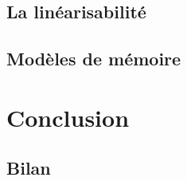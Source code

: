 \subsection{La linéarisabilité}

\subsection{Modèles de mémoire}

 
\section{Conclusion}
\subsection{Bilan}





\endinput
